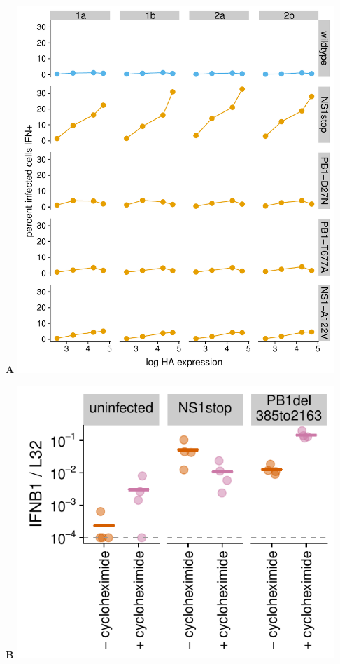 \documentclass[10pt,letterpaper]{article}
\begin{document}
\begin{suppfig}
\begin{minipage}[t]{0.55\textwidth}
{\bf A}
\includegraphics[width=0.9\textwidth, valign=t]{figures/MutantComparison/p_ifn_vs_ha.pdf}
\end{minipage}
\hspace{0.02\textwidth}
\begin{minipage}[t]{0.43\textwidth}
{\bf B}
\includegraphics[width=0.9\textwidth, valign=t]{figures/MutantComparison/cyclo_qPCR_plot.pdf}
\end{minipage}


\end{suppfig}
\end{document}
